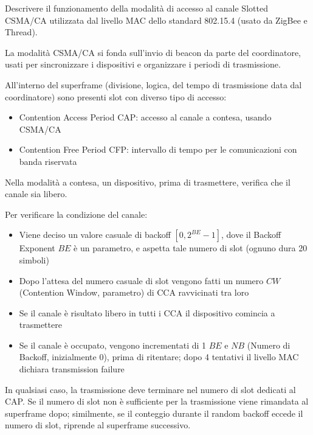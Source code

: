 \begin{questions}
    \question Descrivere il funzionamento della modalità di accesso al canale Slotted CSMA/CA utilizzata dal livello MAC dello standard 802.15.4 (usato da ZigBee e Thread).
    
    \begin{solution}
        La modalità CSMA/CA si fonda sull'invio di beacon da parte del coordinatore, usati per sincronizzare i dispositivi e organizzare i periodi di trasmissione.
        
        All'interno del superframe (divisione, logica, del tempo di trasmissione data dal coordinatore) sono presenti slot con diverso tipo di accesso: 
        \begin{itemize}
            \item Contention Access Period CAP: accesso al canale a contesa, usando CSMA/CA
            
            \item Contention Free Period CFP: intervallo di tempo per le comunicazioni con banda riservata
        \end{itemize}
        
        Nella modalità a contesa, un dispositivo, prima di trasmettere, verifica che il canale sia libero. 
        
        Per verificare la condizione del canale: 
        \begin{itemize}
            \item Viene deciso un valore casuale di backoff $[0, 2^{BE} - 1]$, dove il Backoff Exponent $BE$ è un parametro, e aspetta tale numero di slot (ognuno dura 20 simboli)
            
            \item Dopo l'attesa del numero casuale di slot vengono fatti un numero $CW$ (Contention Window, parametro) di CCA ravvicinati tra loro
            
            \item Se il canale è risultato libero in tutti i CCA il dispositivo comincia a trasmettere
            
            \item Se il canale è occupato, vengono incrementati di 1 $BE$ e $NB$ (Numero di Backoff, inizialmente 0), prima di ritentare; dopo 4 tentativi il livello MAC dichiara transmission failure
        \end{itemize}
        
        In qualsiasi caso, la trasmissione deve terminare nel numero di slot dedicati al CAP. Se il numero di slot non è sufficiente per la trasmissione viene rimandata al superframe dopo; similmente, se il conteggio durante il random backoff eccede il numero di slot, riprende al superframe successivo.
    \end{solution}
    

\end{questions}
